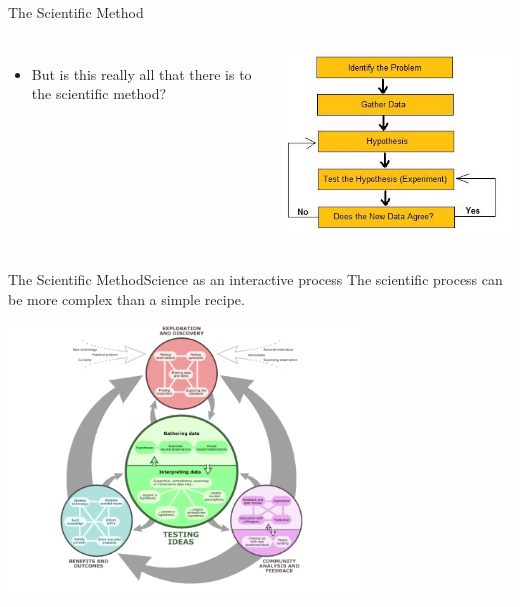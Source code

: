 \documentclass{beamer}
\begin{document}
\begin{CJK}{UTF8}{ipxm}
\begin{frame}{The Scientific Method}{}
\begin{columns}
\begin{itemize}
      \item But is this really all that there is to the scientific method?
    \end{itemize}
      \includegraphics[width=1\textwidth]{../img/scientific_method_simple}
  \end{columns}
\end{frame}

\begin{frame}{The Scientific Method}{Science as an interactive process}
  The scientific process can be more complex than a simple recipe.
  \begin{center}
    \includegraphics[width=0.7\textwidth]{../img/interactive_science}
  \end{center}
\end{frame}


\end{CJK}
\end{document}
